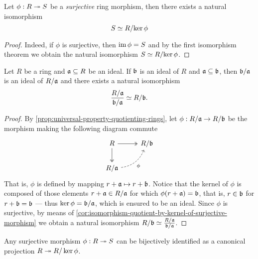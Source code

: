 \begin{corollary}
\label{cor:isomorphism-quotient-by-kernel-of-surjective-morphism}
Let \(\phi: R \twoheadrightarrow S\) be a \emph{surjective} ring morphism, then there exists
a natural isomorphism
\[
S \simeq R/{\ker \phi}
\]
\end{corollary}

\begin{proof}
Indeed, if \(\phi\) is surjective, then \(\operatorname{im} \phi = S\) and by the first
isomorphism theorem we obtain the natural isomorphism \(S \simeq R/{\ker \phi}\).
\end{proof}

\begin{proposition}
\label{prop:ideal-of-a-quotient}
Let \(R\) be a ring and \(\mathfrak{a} \subseteq R\) be an ideal. If \(\mathfrak{b}\)
is an ideal of \(R\) and \(\mathfrak{a} \subseteq \mathfrak{b}\), then
\(\mathfrak{b}/\mathfrak{a}\) is an ideal of \(R/\mathfrak{a}\) and there exists a
natural isomorphism
\[
\frac{R/\mathfrak{a}}{\mathfrak{b}/\mathfrak{a}} \simeq R/\mathfrak{b}.
\]
\end{proposition}

\begin{proof}
By \cref{prop:universal-property-quotienting-rings}, let
\(\phi: R/\mathfrak{a} \to R/\mathfrak{b}\) be the morphism making the following
diagram commute
\[
\begin{tikzcd}
R \ar[r, two heads] \ar[d, two heads] & R/\ideal{b} \\
R/\ideal{a} \ar[ru, dashed, bend right, "\phi"'] &
\end{tikzcd}
\]
That is, \(\phi\) is defined by mapping \(r + \mathfrak{a} \mapsto r +
\mathfrak{b}\). Notice that the kernel of \(\phi\) is composed of those elements
\(r + \mathfrak{a} \in R/\mathfrak{a}\) for which \(\phi(r + \mathfrak{a}) = \mathfrak{b}\),
that is, \(r \in \mathfrak{b}\) for \(r + \mathfrak{b} = \mathfrak{b}\) --- thus
\(\ker \phi = \mathfrak{b}/\mathfrak{a}\), which is ensured to be an ideal. Since
\(\phi\) is surjective, by means of
\cref{cor:isomorphism-quotient-by-kernel-of-surjective-morphism} we obtain a
natural isomorphism \(R/\mathfrak{b} \simeq \frac{R/\mathfrak{a}}{\mathfrak{b}/\mathfrak{a}}\).
\end{proof}

\begin{corollary}
\label{cor:surjective-is-projection-into-quotient}
Any surjective morphism \(\phi: R \twoheadrightarrow S\) can be bijectively identified as a
canonical projection \(R \twoheadrightarrow R/\ker \phi\).
\end{corollary}

